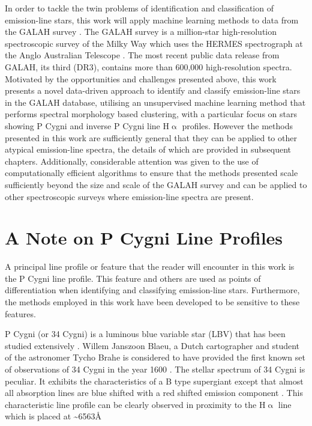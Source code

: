 In order to tackle the twin problems of identification and classification of emission-line stars, this work will apply machine learning methods to data from the GALAH survey \cite{buder2021galah+}. The GALAH survey is a million-star high-resolution spectroscopic survey of the Milky Way which uses the HERMES spectrograph at the Anglo Australian Telescope \cite{de2015galah}. The most recent public data release from GALAH, its third (DR3), contains more than 600,000 high-resolution spectra. Motivated by the opportunities and challenges presented above, this work presents a novel data-driven approach to identify and classify emission-line stars in the GALAH database, utilising an unsupervised machine learning method that performs spectral morphology based clustering, with a particular focus on stars showing P Cygni and inverse P Cygni line H$\upalpha$ profiles. However the methods presented in this work are sufficiently general that they can be applied to other atypical emission-line spectra, the details of which are provided in subsequent chapters. Additionally, considerable attention was given to the use of computationally efficient algorithms to ensure that the methods presented scale sufficiently beyond the size and scale of the GALAH survey and can be applied to other spectroscopic surveys where emission-line spectra are present. 

\section{A Note on P Cygni Line Profiles}

A principal line profile or feature that the reader will encounter in this work is the P Cygni line profile. This feature and others are used as points of differentiation when identifying and classifying emission-line stars. Furthermore, the methods employed in this work have been developed to be sensitive to these features.

P Cygni (or 34 Cygni) is a luminous blue variable star (LBV) that has been studied extensively \cite{1953PDAO....9....1B}\cite{hutchings1969expanding}\cite{elliott20225}\cite{underhill1966supergiants}\cite{mizumoto2018newly}. Willem Janszoon Blaeu, a Dutch cartographer and student of the astronomer Tycho Brahe is considered to have provided the first known set of observations of 34 Cygni in the year 1600 \cite{deGrootPCygni}. The stellar spectrum of 34 Cygni is peculiar. It exhibits the characteristics of a B type supergiant except that almost all absorption lines are blue shifted with a red shifted emission component \cite{hutchings1969expanding}. This characteristic line profile can be clearly observed in proximity to the H$\upalpha$ line which is placed at \textasciitilde 6563\r{A} \cite{zhang2021catalog}\cite{traven2015gaia}

